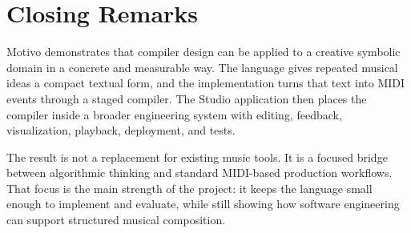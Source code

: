 \section{Closing Remarks}\label{sec:closing}

Motivo demonstrates that compiler design can be applied to a creative symbolic domain in a concrete and measurable way.
The language gives repeated musical ideas a compact textual form, and the implementation turns that text into MIDI
events through a staged compiler.
The Studio application then places the compiler inside a broader engineering system with editing, feedback,
visualization, playback, deployment, and tests.

The result is not a replacement for existing music tools.
It is a focused bridge between algorithmic thinking and standard MIDI-based production workflows.
That focus is the main strength of the project: it keeps the language small enough to implement and evaluate, while
still showing how software engineering can support structured musical composition.
